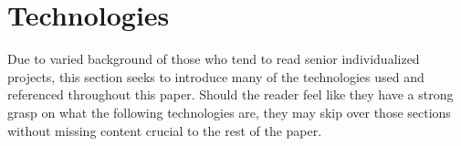 \section{Technologies}
Due to varied background of those who tend to read senior individualized projects, this section seeks to introduce many of the technologies used and referenced throughout this paper.  Should the reader feel like they have a strong grasp on what the following technologies are, they may skip over those sections without missing content crucial to the rest of the paper.



